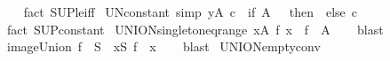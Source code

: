 \begin{isabellebody}
%
\isadelimproof
\ \ %
\endisadelimproof
%
\isatagproof
{}\isamarkupfalse%
\ {\isacharparenleft}{\kern0pt}fact\ SUP{\isacharunderscore}{\kern0pt}le{\isacharunderscore}{\kern0pt}iff{\isacharparenright}{\kern0pt}%
\endisatagproof
{\isafoldproof}%
%
\isadelimproof
\isanewline
%
\endisadelimproof
\isanewline
{}\isamarkupfalse%
\ UN{\isacharunderscore}{\kern0pt}constant\ {\isacharbrackleft}{\kern0pt}simp{\isacharbrackright}{\kern0pt}{\isacharcolon}{\kern0pt}\ {\isachardoublequoteopen}{\isacharparenleft}{\kern0pt}{\isasymUnion}y{\isasymin}A{\isachardot}{\kern0pt}\ c{\isacharparenright}{\kern0pt}\ {\isacharequal}{\kern0pt}\ {\isacharparenleft}{\kern0pt}if\ A\ {\isacharequal}{\kern0pt}\ {\isacharbraceleft}{\kern0pt}{\isacharbraceright}{\kern0pt}\ then\ {\isacharbraceleft}{\kern0pt}{\isacharbraceright}{\kern0pt}\ else\ c{\isacharparenright}{\kern0pt}{\isachardoublequoteclose}\isanewline
%
\isadelimproof
\ \ %
\endisadelimproof
%
\isatagproof
{}\isamarkupfalse%
\ {\isacharparenleft}{\kern0pt}fact\ SUP{\isacharunderscore}{\kern0pt}constant{\isacharparenright}{\kern0pt}%
\endisatagproof
{\isafoldproof}%
%
\isadelimproof
\isanewline
%
\endisadelimproof
\isanewline
{}\isamarkupfalse%
\ UNION{\isacharunderscore}{\kern0pt}singleton{\isacharunderscore}{\kern0pt}eq{\isacharunderscore}{\kern0pt}range{\isacharcolon}{\kern0pt}\ {\isachardoublequoteopen}{\isacharparenleft}{\kern0pt}{\isasymUnion}x{\isasymin}A{\isachardot}{\kern0pt}\ {\isacharbraceleft}{\kern0pt}f\ x{\isacharbraceright}{\kern0pt}{\isacharparenright}{\kern0pt}\ {\isacharequal}{\kern0pt}\ f\ {\isacharbackquote}{\kern0pt}\ A{\isachardoublequoteclose}\isanewline
%
\isadelimproof
\ \ %
\endisadelimproof
%
\isatagproof
{}\isamarkupfalse%
\ blast%
\endisatagproof
{\isafoldproof}%
%
\isadelimproof
\isanewline
%
\endisadelimproof
\isanewline
{}\isamarkupfalse%
\ image{\isacharunderscore}{\kern0pt}Union{\isacharcolon}{\kern0pt}\ {\isachardoublequoteopen}f\ {\isacharbackquote}{\kern0pt}\ {\isasymUnion}S\ {\isacharequal}{\kern0pt}\ {\isacharparenleft}{\kern0pt}{\isasymUnion}x{\isasymin}S{\isachardot}{\kern0pt}\ f\ {\isacharbackquote}{\kern0pt}\ x{\isacharparenright}{\kern0pt}{\isachardoublequoteclose}\isanewline
%
\isadelimproof
\ \ %
\endisadelimproof
%
\isatagproof
{}\isamarkupfalse%
\ blast%
\endisatagproof
{\isafoldproof}%
%
\isadelimproof
\isanewline
%
\endisadelimproof
\isanewline
{}\isamarkupfalse%
\ UNION{\isacharunderscore}{\kern0pt}empty{\isacharunderscore}{\kern0pt}conv{\isacharcolon}{\kern0pt}\isanewline

\end{isabellebody}
